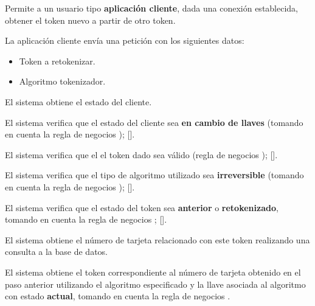 %
%

{
  Permite a un usuario tipo \textbf{aplicación cliente}, dada una conexión
  establecida, obtener el token nuevo a partir de otro token.

  \begin{trayectoriaPrincipal}

    \item La aplicación cliente envía una petición con los siguientes datos:
      \begin{itemize}
        \item Token a retokenizar.
        \item Algoritmo tokenizador.
      \end{itemize}

    \item El sistema obtiene el estado del cliente.

    \item El sistema verifica que el estado del cliente sea
      \textbf{en cambio de llaves} (tomando en cuenta la regla de negocios
      );
      [].

    \item El sistema verifica que el el token dado sea válido (regla de
      negocios );
      [].

    \item El sistema verifica que el tipo de algoritmo utilizado sea
      \textbf{irreversible} (tomando en cuenta la regla de negocios
      );
      [].

    \item El sistema verifica que el estado del token sea \textbf{anterior}
      o \textbf{retokenizado}, tomando en cuenta la regla de negocios
      ;
      [].

    \item El sistema obtiene el número de tarjeta relacionado con este token
      realizando una consulta a la base de datos.

    \item El sistema obtiene el token correspondiente al número de tarjeta
      obtenido en el paso anterior utilizando el algoritmo especificado y la
      llave asociada al algoritmo con estado \textbf{actual}, tomando en cuenta
      la regla de negocios .


\end{trayectoriaPrincipal}}
